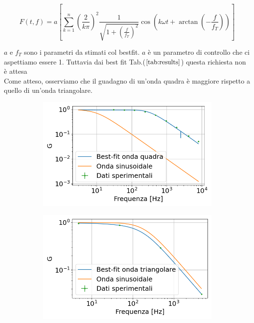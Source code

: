 \documentclass{article}
\begin{document}
    \begin{equation}
        F(t, f) = a \left[\sum_{k=1}^n \left( \frac{2}{k\pi} \right)^2 \frac{1}{\sqrt{1 + \left( \frac{f}{f_T} \right)^2}} \cos{\left( k\omega t + \arctan{\left(-\frac{f}{f_T}\right)} \right)}\right]
        \label{eq:gain_trian}
    \end{equation}
    
    $a$ e $f_T$ sono i parametri da stimati col bestfit. $a$ è un parametro di controllo che ci 
    aspettiamo essere 1. Tuttavia dai best fit Tab.($\ref{tab:results}$) questa richiesta non è attesa\\
    Come atteso, osserviamo che il guadagno di un'onda quadra è maggiore rispetto a quello di un'onda triangolare. 
        \begin{figure}[htbp]
            \centering
            \begin{subfigure}{0.45\textwidth} %
                \centering
                \includegraphics[width=\textwidth]{gain_squarewave.png} %
                \caption{}
                \label{fig:image1}
            \end{subfigure}
            \hfill %
            \begin{subfigure}{0.45\textwidth} %
                \centering
                \includegraphics[width=\textwidth]{gain_trianwave.png} %

\end{subfigure}
\end{figure}
\end{document}
